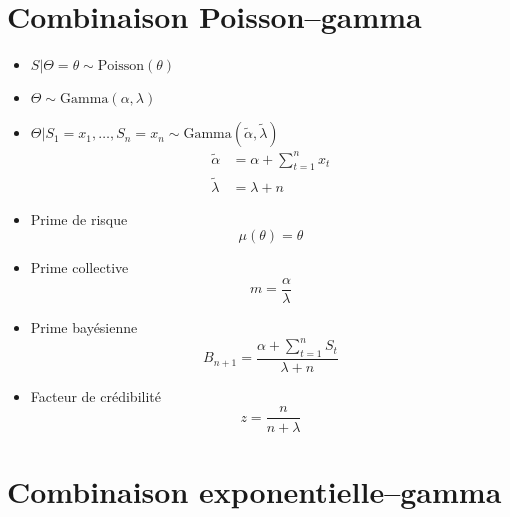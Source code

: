 \section{Combinaison Poisson--gamma}

\begin{itemize}
\item $S|\Theta = \theta \sim \text{Poisson}(\theta)$
\item $\Theta \sim \text{Gamma}(\alpha, \lambda)$
\item $\Theta|S_1 = x_1, \dots, S_n = x_n \sim
  \text{Gamma}(\tilde{\alpha}, \tilde{\lambda})$
  \begin{align*}
    \tilde{\alpha} &= \alpha + \sum_{t = 1}^n x_t \\
    \tilde{\lambda} &= \lambda + n
  \end{align*}
\item Prime de risque
  \begin{equation*}
    \mu(\theta) = \theta
  \end{equation*}
\item Prime collective
  \begin{equation*}
    m = \frac{\alpha}{\lambda}
  \end{equation*}
\item Prime bayésienne
  \begin{equation*}
    B_{n + 1} = \frac{\alpha + \sum_{t = 1}^n S_t}{\lambda + n}
  \end{equation*}
\item Facteur de crédibilité
  \begin{equation*}
    z = \frac{n}{n + \lambda}
  \end{equation*}
\end{itemize}


\section{Combinaison exponentielle--gamma}

